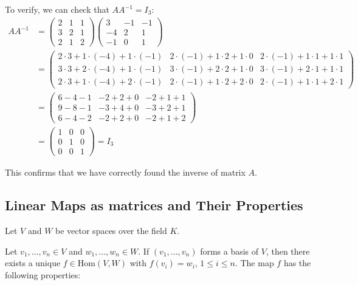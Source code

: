 To verify, we can check that \(AA^{-1} = I_3\):
\begin{align*}
AA^{-1} &= 
\begin{pmatrix}
2 & 1 & 1 \\
3 & 2 & 1 \\
2 & 1 & 2
\end{pmatrix}
\begin{pmatrix}
3 & -1 & -1 \\
-4 & 2 & 1 \\
-1 & 0 & 1
\end{pmatrix} \\
&= 
\begin{pmatrix}
2 \cdot 3 + 1 \cdot (-4) + 1 \cdot (-1) & 2 \cdot (-1) + 1 \cdot 2 + 1 \cdot 0 & 2 \cdot (-1) + 1 \cdot 1 + 1 \cdot 1 \\
3 \cdot 3 + 2 \cdot (-4) + 1 \cdot (-1) & 3 \cdot (-1) + 2 \cdot 2 + 1 \cdot 0 & 3 \cdot (-1) + 2 \cdot 1 + 1 \cdot 1 \\
2 \cdot 3 + 1 \cdot (-4) + 2 \cdot (-1) & 2 \cdot (-1) + 1 \cdot 2 + 2 \cdot 0 & 2 \cdot (-1) + 1 \cdot 1 + 2 \cdot 1
\end{pmatrix} \\
&= 
\begin{pmatrix}
6 - 4 - 1 & -2 + 2 + 0 & -2 + 1 + 1 \\
9 - 8 - 1 & -3 + 4 + 0 & -3 + 2 + 1 \\
6 - 4 - 2 & -2 + 2 + 0 & -2 + 1 + 2
\end{pmatrix} \\
&= 
\begin{pmatrix}
1 & 0 & 0 \\
0 & 1 & 0 \\
0 & 0 & 1
\end{pmatrix} = I_3
\end{align*}

This confirms that we have correctly found the inverse of matrix \(A\).

\subsection{Linear Maps as matrices and Their Properties}

Let \(V\) and \(W\) be vector spaces over the field \(K\).
\vspace{\baselineskip}

Let \(v_1, \dots, v_n \in V\) and \(w_1, \dots, w_n \in W\). If \((v_1, \dots, v_n)\) 
forms a basis of \(V\), then there exists a unique \(f \in \text{Hom}(V, W)\) with 
\(f(v_i) = w_i\), \(1 \leq i \leq n\). The map \(f\) has the following properties:

